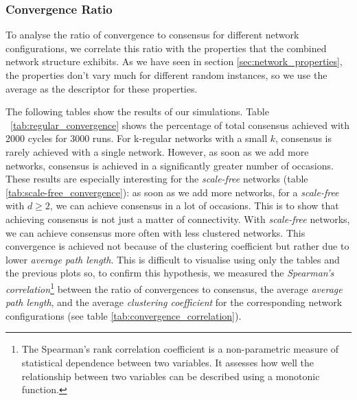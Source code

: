 \documentclass[preprint,number]{elsarticle}
\begin{document}
        \subsubsection{Convergence Ratio}
        \label{sec:ctx_perm_convergence}
        \noindent To analyse the ratio of convergence to consensus for different network
        configurations, we correlate this ratio with the properties that the combined network
        structure exhibits. As we have seen in section \ref{sec:network_properties}, the properties
        don't vary much for different random instances, so we use the average as the descriptor for
        these properties.

        The following tables show the results of our simulations. Table
        ~\ref{tab:regular_convergence} shows the percentage of total consensus achieved with 2000
        cycles for 3000 runs. For k-regular networks with a small $k$, consensus is rarely achieved
        with a single network. However, as soon as we add more networks, consensus is achieved in a
        significantly greater number of occasions. These results are especially interesting for the
        \textit{scale-free} networks (table \ref{tab:scale-free_convergence}): as soon as we add
        more networks, for a \textit{scale-free} with $d\ge2$, we can achieve consensus in a lot of
        occasions. This is to show that achieving consensus is not just a matter of
        connectivity. With \textit{scale-free} networks, we can achieve consensus more often with
        less clustered networks. This convergence is achieved not because of the clustering
        coefficient but rather due to lower \textit{average path length}. This is difficult to
        visualise using only the tables and the previous plots so, to confirm this hypothesis, we
        measured the \textit{Spearman's correlation}\footnote{The Spearman's rank correlation
          coefficient is a non-parametric measure of statistical dependence between two variables. It
          assesses how well the relationship between two variables can be described using a
          monotonic function.} between the ratio of convergences to consensus, the average
        \textit{average path length}, and the average \textit{clustering coefficient} for the
        corresponding network configurations (see table \ref{tab:convergence_correlation}).
\end{document}
